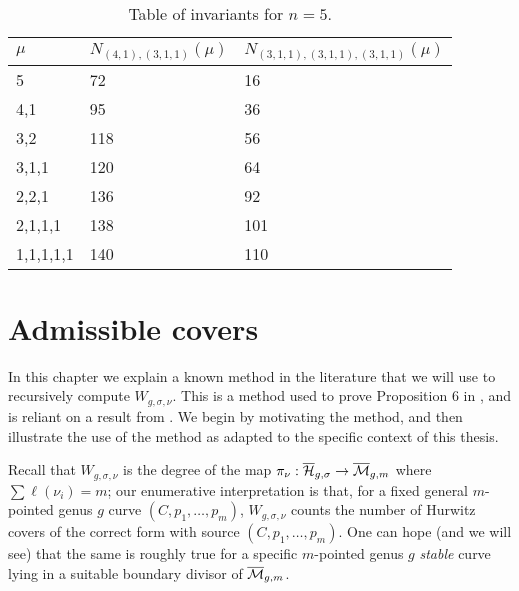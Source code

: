\documentclass[thesis]{thesis-umich}           %
\newcommand{\Hb}{\overline{\mathcal H}}
\theoremstyle{definition}
\begin{document}
  \begin{table}[h]
    \caption{Table of invariants for $n=5$.}
    \centering
    ~\\
\begin{tabular}{|l|l|l|}
\hline
$\mu$             & $N_{(4,1),(3,1,1)}(\mu)$ & $N_{(3,1,1),(3,1,1),(3,1,1)}(\mu)$ \\ \hline
{5} & {72}                                       & {16}                    \\ \hline
4,1                     & {95}                                       & {36}                    \\ \hline
3,2                     & {118}                                      & {56}                    \\ \hline
3,1,1                   & {120}                                      & {64}                    \\ \hline
2,2,1                   & {136}                                      & {92}                    \\ \hline
2,1,1,1                 & {138}                                      & {101}                   \\ \hline
1,1,1,1,1               & {140}                                      & 110                                        \\ \hline
\end{tabular}
\end{table}

\chapter{Admissible covers}
\label{section:admissible}

In this chapter we explain a known method in the literature that we will use
to recursively compute $W_{g,\sigma,\nu}$. This is a method used to prove Proposition 6 in \cite{Generalized}, and is reliant on a result from \cite{Lian}. We begin by motivating the method, and then illustrate the use of the method as adapted to the specific context of this thesis.

Recall that $W_{g,\sigma,\nu}$ is the degree of the map $\pi_{\nu}:\Hb_{g,\sigma}\to\mb_{g,m}$
where $\sum\ell(\nu_i)=m$; our enumerative interpretation is that, for a fixed general $m$-pointed genus $g$ curve $(C,p_1,\dots,p_m)$, $W_{g,\sigma,\nu}$ counts the number of Hurwitz covers of the correct form with source $(C,p_1,\dots,p_m)$. One can hope (and we will see) that the same is roughly true for
a specific $m$-pointed genus $g$ {\it stable} curve lying in a suitable boundary divisor of $\overline{\mathcal M}_{g,m}$.
\end{document}
